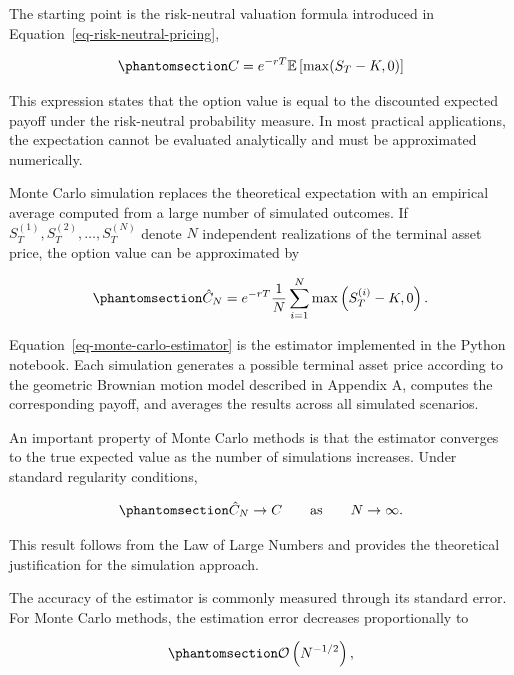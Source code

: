 \documentclass[
  12pt,
  letterpaper,
]{book}
\begin{document}
The starting point is the risk-neutral valuation formula introduced in
Equation~\ref{eq-risk-neutral-pricing},

\begin{equation}\phantomsection\label{eq-risk-neutral-pricing-mc}{
C = e^{-rT}\mathbb{E}\left[\max(S_T-K,0)\right]
}\end{equation}

This expression states that the option value is equal to the discounted
expected payoff under the risk-neutral probability measure. In most
practical applications, the expectation cannot be evaluated analytically
and must be approximated numerically.

Monte Carlo simulation replaces the theoretical expectation with an
empirical average computed from a large number of simulated outcomes. If
\(S_T^{(1)}, S_T^{(2)}, \ldots, S_T^{(N)}\) denote \(N\) independent
realizations of the terminal asset price, the option value can be
approximated by

\begin{equation}\phantomsection\label{eq-monte-carlo-estimator}{
\hat{C}_N =
e^{-rT}
\frac{1}{N}
\sum_{i=1}^{N}
\max\left(S_T^{(i)}-K,0\right).
}\end{equation}

Equation~\ref{eq-monte-carlo-estimator} is the estimator implemented in
the Python notebook. Each simulation generates a possible terminal asset
price according to the geometric Brownian motion model described in
Appendix A, computes the corresponding payoff, and averages the results
across all simulated scenarios.

An important property of Monte Carlo methods is that the estimator
converges to the true expected value as the number of simulations
increases. Under standard regularity conditions,

\begin{equation}\phantomsection\label{eq-monte-carlo-convergence}{
\hat{C}_N
\rightarrow
C
\qquad
\text{as}
\qquad
N \rightarrow \infty.
}\end{equation}

This result follows from the Law of Large Numbers and provides the
theoretical justification for the simulation approach.

The accuracy of the estimator is commonly measured through its standard
error. For Monte Carlo methods, the estimation error decreases
proportionally to

\begin{equation}\phantomsection\label{eq-monte-carlo-error}{
\mathcal{O}\left(N^{-1/2}\right),
}\end{equation}
\end{document}
